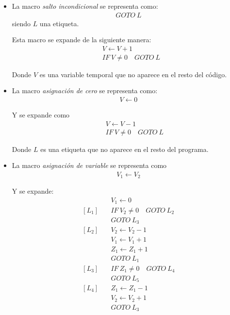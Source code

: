 \begin{itemize}
    \item La macro \textit{salto incondicional} se representa como:
        \begin{gather*}
            GOTO ~ L
        \end{gather*}
        siendo $L$ una etiqueta.

        Esta macro se expande de la siguiente manera:
        \begin{align*}
            &V \gets V + 1 \\
            &IF ~ V \neq 0 \quad GOTO ~ L
        \end{align*}

        Donde $V$ es una variable temporal que no aparece en el resto del 
        código.

    \item La macro \textit{asignación de cero} se representa como:
        \begin{gather*}
            V \gets 0
        \end{gather*}

        Y se expande como
        \begin{align*}
            [L] \quad &V \gets V - 1 \\
                      &IF ~ V \neq 0 \quad GOTO ~ L
        \end{align*}

        Donde $L$ es una etiqueta que no aparece en el resto del programa.

    \item La macro \textit{asignación de variable} se representa como
        \begin{gather*}
            V_1 \gets V_2
        \end{gather*}

        Y se expande:
        \begin{align*}
                        &V_1 \gets 0 \\
            [L_1] \quad &IF ~ V_2 \neq 0 \quad GOTO ~ L_2 \\
                        &GOTO ~ L_3 \\
            [L_2] \quad &V_2 \gets V_2 -1 \\
                        &V_1 \gets V_1 + 1 \\
                        &Z_1 \gets Z_1 + 1 \\
                        &GOTO ~ L_1 \\
            [L_3] \quad &IF ~ Z_1 \neq 0 \quad GOTO ~ L_4 \\
                        &GOTO ~ L_5 \\
            [L_4] \quad &Z_1 \gets Z_1 - 1 \\
                        &V_2 \gets V_2 + 1 \\
                        &GOTO ~ L_3
        \end{align*}


\end{itemize}
